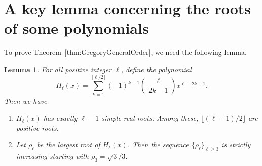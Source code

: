 \documentclass[11pt]{article}
\theoremstyle{plain}
\newtheorem{lem}[thm]{Lemma}
\theoremstyle{definition}
\begin{document}
\section{A key lemma concerning the roots of some polynomials}

To prove Theorem~\ref{thm:GregoryGeneralOrder}, we need the following lemma.

\begin{lem}\label{equ:keyLem}
For all positive integer $\ell$, define the polynomial
\begin{equation*}
    H_{\ell}(x)= \sum_{k=1}^{\lceil \ell/2\rceil} (-1)^{k-1} \binom{\ell}{2k-1} x^{\ell-2k+1}.
\end{equation*}
Then we have
\begin{enumerate}
  \item[\upshape{(i)}] $H_{\ell}(x)$ has exactly $\ell-1$ simple real roots. Among these, $\lfloor (\ell-1)/2 \rfloor$ are positive roots.

  \item[\upshape{(ii)}] Let $\rho_\ell$ be the largest root of $H_{\ell}(x)$. Then the sequence $\{\rho_\ell\}_{\ell\ge 3}$ is strictly
  increasing starting with $\rho_3=\sqrt{3}/3$.
\end{enumerate}

\end{lem}
\end{document}
